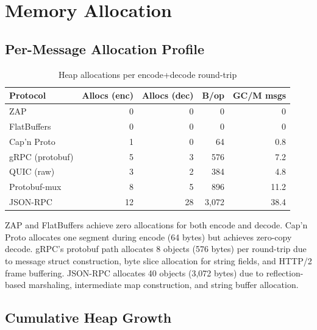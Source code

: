 \section{Memory Allocation}


\subsection{Per-Message Allocation Profile}

\begin{table}[h]
\centering
\caption{Heap allocations per encode+decode round-trip}
\label{tab:allocs}
\small
\begin{tabular}{lrrrr}
\toprule
\textbf{Protocol} & \textbf{Allocs (enc)} & \textbf{Allocs (dec)} & \textbf{B/op} & \textbf{GC/M msgs} \\
\midrule
\rowcolor{luxblue!10}
ZAP & 0 & 0 & 0 & 0 \\
FlatBuffers & 0 & 0 & 0 & 0 \\
Cap'n Proto & 1 & 0 & 64 & 0.8 \\
gRPC (protobuf) & 5 & 3 & 576 & 7.2 \\
QUIC (raw) & 3 & 2 & 384 & 4.8 \\
Protobuf-mux & 8 & 5 & 896 & 11.2 \\
JSON-RPC & 12 & 28 & 3,072 & 38.4 \\
\bottomrule
\end{tabular}
\end{table}

ZAP and FlatBuffers achieve zero allocations for both encode and decode. Cap'n Proto allocates one segment during encode (64 bytes) but achieves zero-copy decode. gRPC's protobuf path allocates 8 objects (576 bytes) per round-trip due to message struct construction, byte slice allocation for string fields, and HTTP/2 frame buffering. JSON-RPC allocates 40 objects (3,072 bytes) due to reflection-based marshaling, intermediate map construction, and string buffer allocation.

\subsection{Cumulative Heap Growth}

